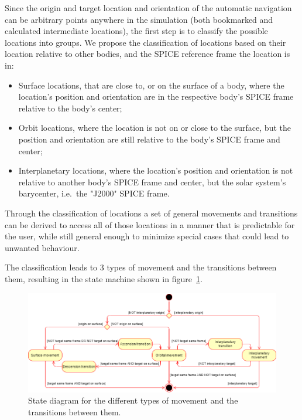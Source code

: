 Since the origin and target location and orientation of the automatic navigation can be arbitrary points anywhere in
the simulation (both bookmarked and calculated intermediate locations), the first step is to classify the possible
locations into groups.
We propose the classification of locations based on their location relative to other bodies, and the SPICE reference
frame the location is in:
\begin{itemize}
    \item Surface locations, that are close to, or on the surface of a body, where the location's position and
    orientation are in the respective body's SPICE frame relative to the body's center;
    \item Orbit locations, where the location is not on or close to the surface, but the position and orientation
    are still relative to the body's SPICE frame and center;
    \item Interplanetary locations, where the location's position and orientation is not relative to another body's
    SPICE frame and center, but the solar system's barycenter, i.e.\ the "J2000" SPICE frame.
\end{itemize}
Through the classification of locations a set of general movements and transitions can be derived to access all of
those locations in a manner that is predictable for the user, while still general enough to minimize special cases
that could lead to unwanted behaviour.

The classification leads to 3 types of movement and the transitions between them, resulting in the state machine
shown in figure~\ref{fig:nav-states}.

\begin{figure}[h]
    \centering
    \includegraphics[width=\textwidth]{content/4_3_autoNavigation/img/NavigationStateDiagram}
    \caption{State diagram for the different types of movement and the transitions between them.}
    \label{fig:nav-states}
\end{figure}

